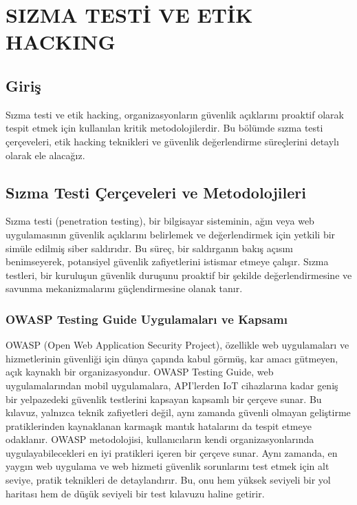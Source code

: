 \chapter{SIZMA TESTİ VE ETİK HACKING}

\section*{Giriş}
Sızma testi ve etik hacking, organizasyonların güvenlik açıklarını proaktif olarak tespit etmek için kullanılan kritik metodolojilerdir. Bu bölümde sızma testi çerçeveleri, etik hacking teknikleri ve güvenlik değerlendirme süreçlerini detaylı olarak ele alacağız.

\section{Sızma Testi Çerçeveleri ve Metodolojileri}

Sızma testi (penetration testing), bir bilgisayar sisteminin, ağın veya web uygulamasının güvenlik açıklarını belirlemek ve değerlendirmek için yetkili bir simüle edilmiş siber saldırıdır. Bu süreç, bir saldırganın bakış açısını benimseyerek, potansiyel güvenlik zafiyetlerini istismar etmeye çalışır. Sızma testleri, bir kuruluşun güvenlik duruşunu proaktif bir şekilde değerlendirmesine ve savunma mekanizmalarını güçlendirmesine olanak tanır.

\subsection{OWASP Testing Guide Uygulamaları ve Kapsamı}

OWASP (Open Web Application Security Project), özellikle web uygulamaları ve hizmetlerinin güvenliği için dünya çapında kabul görmüş, kar amacı gütmeyen, açık kaynaklı bir organizasyondur. OWASP Testing Guide, web uygulamalarından mobil uygulamalara, API'lerden IoT cihazlarına kadar geniş bir yelpazedeki güvenlik testlerini kapsayan kapsamlı bir çerçeve sunar. Bu kılavuz, yalnızca teknik zafiyetleri değil, aynı zamanda güvenli olmayan geliştirme pratiklerinden kaynaklanan karmaşık mantık hatalarını da tespit etmeye odaklanır.
OWASP metodolojisi, kullanıcıların kendi organizasyonlarında uygulayabilecekleri en iyi pratikleri içeren bir çerçeve sunar. Aynı zamanda, en yaygın web uygulama ve web hizmeti güvenlik sorunlarını test etmek için alt seviye, pratik teknikleri de detaylandırır. Bu, onu hem yüksek seviyeli bir yol haritası hem de düşük seviyeli bir test kılavuzu haline getirir.

